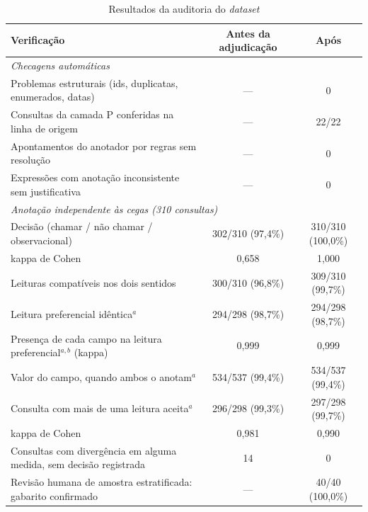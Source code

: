 \begin{table}[htbp!]
\centering
\caption{Resultados da auditoria do \textit{dataset}}
\label{tab:auditoria}
\small
\begin{tabular}{|p{7.3cm}|c|c|}
\hline
\textbf{Verificação} & \textbf{Antes da adjudicação} & \textbf{Após} \\
\hline
\multicolumn{3}{|l|}{\textit{Checagens automáticas}} \\ \hline
Problemas estruturais (ids, duplicatas, enumerados, datas) & --- & 0 \\ \hline
Consultas da camada P conferidas na linha de origem & --- & 22/22 \\ \hline
Apontamentos do anotador por regras sem resolução & --- & 0 \\ \hline
Expressões com anotação inconsistente sem justificativa & --- & 0 \\ \hline
\multicolumn{3}{|l|}{\textit{Anotação independente às cegas (310 consultas)}} \\ \hline
Decisão (chamar / não chamar / observacional) & 302/310 (97,4\%) & 310/310 (100,0\%) \\
\quad kappa de Cohen & 0,658 & 1,000 \\ \hline
Leituras compatíveis nos dois sentidos & 300/310 (96,8\%) & 309/310 (99,7\%) \\ \hline
Leitura preferencial idêntica$^{a}$ & 294/298 (98,7\%) & 294/298 (98,7\%) \\ \hline
Presença de cada campo na leitura preferencial$^{a,b}$ (kappa) & 0,999 & 0,999 \\ \hline
Valor do campo, quando ambos o anotam$^{a}$ & 534/537 (99,4\%) & 534/537 (99,4\%) \\ \hline
Consulta com mais de uma leitura aceita$^{a}$ & 296/298 (99,3\%) & 297/298 (99,7\%) \\
\quad kappa de Cohen & 0,981 & 0,990 \\ \hline
Consultas com divergência em alguma medida, sem decisão registrada & 14 & 0 \\ \hline
Revisão humana de amostra estratificada: gabarito confirmado & --- & 40/40 (100,0\%) \\ \hline
\end{tabular}
\end{table}
